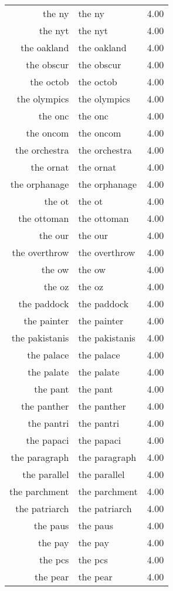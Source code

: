 \begin{table}[ht]
\begin{tabular}{rlr}
  the ny & the ny & 4.00 \\ 
  the nyt & the nyt & 4.00 \\ 
  the oakland & the oakland & 4.00 \\ 
  the obscur & the obscur & 4.00 \\ 
  the octob & the octob & 4.00 \\ 
  the olympics & the olympics & 4.00 \\ 
  the onc & the onc & 4.00 \\ 
  the oncom & the oncom & 4.00 \\ 
  the orchestra & the orchestra & 4.00 \\ 
  the ornat & the ornat & 4.00 \\ 
  the orphanage & the orphanage & 4.00 \\ 
  the ot & the ot & 4.00 \\ 
  the ottoman & the ottoman & 4.00 \\ 
  the our & the our & 4.00 \\ 
  the overthrow & the overthrow & 4.00 \\ 
  the ow & the ow & 4.00 \\ 
  the oz & the oz & 4.00 \\ 
  the paddock & the paddock & 4.00 \\ 
  the painter & the painter & 4.00 \\ 
  the pakistanis & the pakistanis & 4.00 \\ 
  the palace & the palace & 4.00 \\ 
  the palate & the palate & 4.00 \\ 
  the pant & the pant & 4.00 \\ 
  the panther & the panther & 4.00 \\ 
  the pantri & the pantri & 4.00 \\ 
  the papaci & the papaci & 4.00 \\ 
  the paragraph & the paragraph & 4.00 \\ 
  the parallel & the parallel & 4.00 \\ 
  the parchment & the parchment & 4.00 \\ 
  the patriarch & the patriarch & 4.00 \\ 
  the paus & the paus & 4.00 \\ 
  the pay & the pay & 4.00 \\ 
  the pcs & the pcs & 4.00 \\ 
  the pear & the pear & 4.00 \\ 

\end{tabular}
\end{table}
